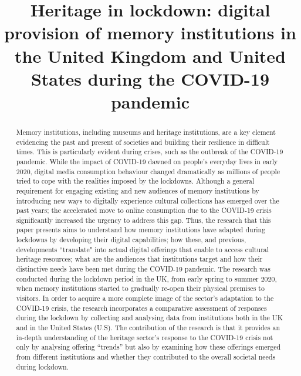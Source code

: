 \documentclass{egpubl}
\title[Heritage in lockdown: digital provision of memory institutions during the COVID-19 pandemic]%
      {Heritage in lockdown: digital provision of memory institutions in the United Kingdom and United States during the COVID-19 pandemic}
\begin{document}

\maketitle
\begin{abstract}
Memory institutions, including museums and heritage institutions, are a key element evidencing the past and present of societies and building their resilience in difficult times. This is particularly evident during crises, such as the outbreak of the COVID-19 pandemic. While the impact of COVID-19 dawned on people's everyday lives in early 2020, digital media consumption behaviour changed dramatically as millions of people tried to cope with the realities imposed by the lockdowns. Although a general requirement for engaging existing and new audiences of memory institutions by introducing new ways to digitally experience cultural collections has emerged over the past years; the accelerated move to online consumption due to the COVID-19 crisis significantly increased the urgency to address this gap. Thus, the research that this paper presents aims to understand how memory institutions have adapted during lockdowns by developing their digital capabilities; how these, and previous, developments ``translate" into actual digital offerings that enable to access cultural heritage resources; what are the audiences that institutions target and how their distinctive needs have been met during the COVID-19 pandemic. The research  was conducted during the lockdown period in the UK, from early spring to summer 2020, when memory institutions started to gradually re-open their physical premises to visitors. In order to acquire a more complete image of the sector's adaptation to the COVID-19 crisis, the research incorporates a comparative assessment of responses during the lockdown by collecting and analysing data from institutions both in the UK and in the United States (U.S). The contribution of the research is that it provides an in-depth understanding of the heritage sector's response to the COVID-19 crisis not only by analysing offering ``trends'' but also by examining how these offerings emerged from different institutions and whether they contributed to the overall societal needs during lockdown. 


\end{abstract}
\end{document}

